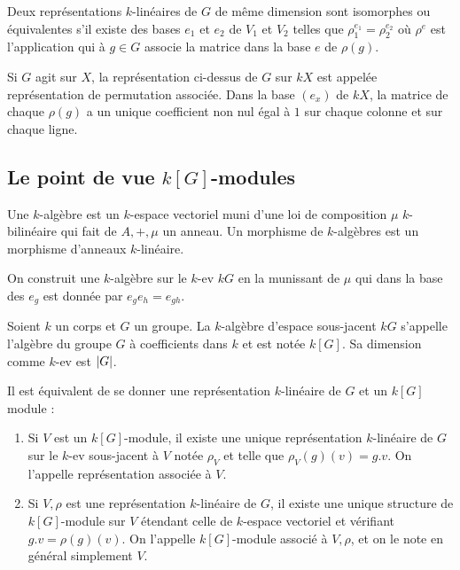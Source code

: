 \documentclass{cours}
\begin{document}
\begin{definition}
    Deux représentations $k$-linéaires de $G$ de même dimension sont isomorphes ou équivalentes s'il existe des bases $e_{1}$ et $e_{2}$ de $V_{1}$ et $V_{2}$ telles que $\rho_{1}^{e_{1}} = \rho_{2}^{e_{2}}$ où $\rho^{e}$ est l'application qui à $g \in G$ associe la matrice dans la base $e$ de $\rho(g)$.
\end{definition}

\begin{definition}
    Si $G$ agit sur $X$, la représentation ci-dessus de $G$ sur $kX$ est appelée représentation de permutation associée. Dans la base $(e_{x})$ de $kX$, la matrice de chaque $\rho(g)$ a un unique coefficient non nul égal à $1$ sur chaque colonne et sur chaque ligne. 
\end{definition}

\subsection{Le point de vue $k[G]$-modules}
\begin{definition}
    Une $k$-algèbre est un $k$-espace vectoriel muni d'une loi de composition $\mu$ $k$-bilinéaire qui fait de $A, +, \mu$ un anneau. Un morphisme de $k$-algèbres est un morphisme d'anneaux $k$-linéaire. 
\end{definition}

On construit une $k$-algèbre sur le $k$-ev $kG$ en la munissant de $\mu$ qui dans la base des $e_{g}$ est donnée par $e_{g}e_{h} = e_{gh}$. 

\begin{definition}
    Soient $k$ un corps et $G$ un groupe. La $k$-algèbre d'espace sous-jacent $kG$ s'appelle l'algèbre du groupe $G$ à coefficients dans $k$ et est notée $k[G]$. Sa dimension comme $k$-ev est $\left|G\right|$.
\end{definition}

\begin{proposition}
    Il est équivalent de se donner une représentation $k$-linéaire de $G$ et un $k[G]$ module : 
    \begin{enumerate}
        \item Si $V$ est un $k[G]$-module, il existe une unique représentation $k$-linéaire de $G$ sur le $k$-ev sous-jacent à $V$ notée $\rho_{V}$ et telle que $\rho_{V}(g)(v) = g.v$. On l'appelle représentation associée à $V$.  
        \item Si $V, \rho$ est une représentation $k$-linéaire de $G$, il existe une unique structure de $k[G]$-module sur $V$ étendant celle de $k$-espace vectoriel et vérifiant $g.v = \rho(g)(v)$. On l'appelle $k[G]$-module associé à $V, \rho$, et on le note en général simplement $V$. 
    \end{enumerate}
\end{proposition}
\end{document}
